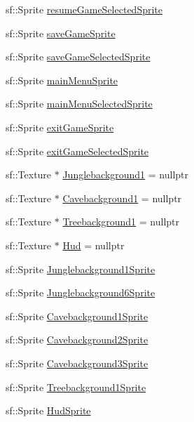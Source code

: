 \begin{DoxyCompactItemize}
\item 
sf\+::\+Sprite \hyperlink{classTestApp_ab648e1b4ef3f657ca152176709c17ccc}{resume\+Game\+Selected\+Sprite}
\item 
sf\+::\+Sprite \hyperlink{classTestApp_ac41e21b394f9e3e448503aa4afecf169}{save\+Game\+Sprite}
\item 
sf\+::\+Sprite \hyperlink{classTestApp_ae592b3a36dff7a6a45b669a65e5862fb}{save\+Game\+Selected\+Sprite}
\item 
sf\+::\+Sprite \hyperlink{classTestApp_a052722ceb28f1f2158513869d135057e}{main\+Menu\+Sprite}
\item 
sf\+::\+Sprite \hyperlink{classTestApp_a095a03ff9f6700d21532beac758c27d3}{main\+Menu\+Selected\+Sprite}
\item 
sf\+::\+Sprite \hyperlink{classTestApp_a55bf93b6dbf3838aacc67f652a3ff48d}{exit\+Game\+Sprite}
\item 
sf\+::\+Sprite \hyperlink{classTestApp_a2b07fb8cf4cb37fc1da99f91fa1543ed}{exit\+Game\+Selected\+Sprite}
\item 
sf\+::\+Texture $\ast$ \hyperlink{classTestApp_a3062972c2b6d27d13dd723ca051612a7}{Junglebackground1} = nullptr
\item 
sf\+::\+Texture $\ast$ \hyperlink{classTestApp_aca476749426ccca98e07588e5888c214}{Cavebackground1} = nullptr
\item 
sf\+::\+Texture $\ast$ \hyperlink{classTestApp_a4695890302b958844789db4f9b168647}{Treebackground1} = nullptr
\item 
sf\+::\+Texture $\ast$ \hyperlink{classTestApp_a269555e11bf42aab46e5e23a69473d81}{Hud} = nullptr
\item 
sf\+::\+Sprite \hyperlink{classTestApp_a6c8eddb0bd8781384f6c01a7bfbc9a51}{Junglebackground1\+Sprite}
\item 
sf\+::\+Sprite \hyperlink{classTestApp_a26d4bf97ca9531e4fcf5069a73a3109b}{Junglebackground6\+Sprite}
\item 
sf\+::\+Sprite \hyperlink{classTestApp_aae6a227649f203e4941cfafd544b0b71}{Cavebackground1\+Sprite}
\item 
sf\+::\+Sprite \hyperlink{classTestApp_af58194d71f83a1cd042f12f0984f3621}{Cavebackground2\+Sprite}
\item 
sf\+::\+Sprite \hyperlink{classTestApp_a2cd32e68938bccd135ddf09679e685e9}{Cavebackground3\+Sprite}
\item 
sf\+::\+Sprite \hyperlink{classTestApp_a3cc57075ee88b4efd811e9a0ebac1d04}{Treebackground1\+Sprite}
\item 
sf\+::\+Sprite \hyperlink{classTestApp_a7274d6cbe7a9f3395189612e78d1329a}{Hud\+Sprite}

\end{DoxyCompactItemize}
